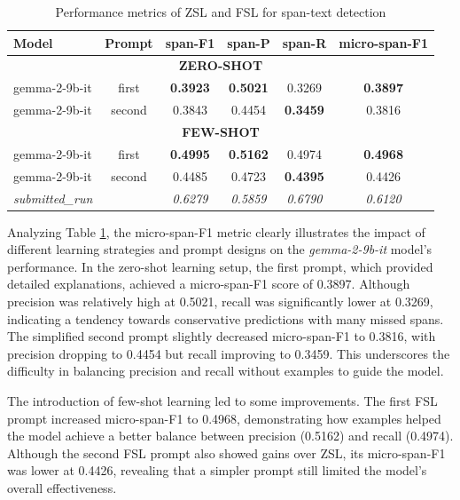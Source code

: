 \documentclass{Configuration_Files/PoliMi3i_thesis}
\begin{document}
\begin{table}[H]
\centering
\small
\renewcommand{\arraystretch}{1.2} %
\begin{tabular}{lccccc}
\hline
\textbf{Model} & \textbf{Prompt} & \textbf{span-F1} & \textbf{span-P} & \textbf{span-R} & \textbf{micro-span-F1} \\
\hline
\multicolumn{6}{c}{\textbf{ZERO-SHOT}} \\
\hline
    gemma-2-9b-it  & first  &  \textbf{0.3923} & \textbf{0.5021} & 0.3269 & \textbf{0.3897} \\   
    gemma-2-9b-it  & second &  0.3843 & 0.4454 & \textbf{0.3459} & 0.3816 \\   
\hline
\multicolumn{6}{c}{\textbf{FEW-SHOT}} \\
\hline
    gemma-2-9b-it  & first & \textbf{0.4995} & \textbf{0.5162} & 0.4974 & \textbf{0.4968} \\   
    gemma-2-9b-it  & second & 0.4485 & 0.4723 & \textbf{0.4395} & 0.4426 \\   
\hline
\hline
\textit{submitted\_run} &  & \textit{0.6279} & \textit{0.5859} & \textit{0.6790} & \textit{0.6120}  \\
\hline
\end{tabular}
\caption{Performance metrics of ZSL and FSL for span-text detection}
\label{tab:performance_T2_ZSL_FSL}
\end{table}
\FloatBarrier


Analyzing Table \ref{tab:performance_T2_ZSL_FSL}, the micro-span-F1 metric clearly illustrates the impact of different learning strategies and prompt designs on the \textit{gemma-2-9b-it} model's performance. In the zero-shot learning setup, the first prompt, which provided detailed explanations, achieved a micro-span-F1 score of 0.3897. Although precision was relatively high at 0.5021, recall was significantly lower at 0.3269, indicating a tendency towards conservative predictions with many missed spans. The simplified second prompt slightly decreased micro-span-F1 to 0.3816, with precision dropping to 0.4454 but recall improving to 0.3459. This underscores the difficulty in balancing precision and recall without examples to guide the model.

The introduction of few-shot learning led to some improvements. The first FSL prompt increased micro-span-F1 to 0.4968, demonstrating how examples helped the model achieve a better balance between precision (0.5162) and recall (0.4974). Although the second FSL prompt also showed gains over ZSL, its micro-span-F1 was lower at 0.4426, revealing that a simpler prompt still limited the model's overall effectiveness.
\end{document}
